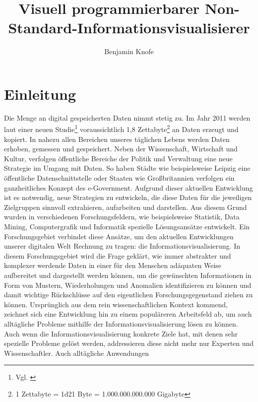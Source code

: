 \documentclass[a4paper, 12pt, DIVcalc, onepage, pdftex, headsepline, footsepline]{scrreprt}
\begin{document}
\title{Visuell programmierbarer Non-Standard-Informationsvisualisierer}
\author{Benjamin Knofe}
\subject{Diplomarbeit}
\publishers{Hochschule für Technik, Wirtschaft und Kultur Leipzig}
\dedication{Dank an \\ Pyry Jahkola, Philip Whitfield}
\maketitle
\tableofcontents

\chapter{Einleitung}
\label{cha:Einleitung}
Die Menge an digital gespeicherten Daten nimmt stetig zu. Im Jahr 2011 werden laut einer neuen
Studie\footnote{Vgl. \citep{EMC}} voraussichtlich 1,8 Zettabyte\footnote{1 Zettabyte = \num{1d21}
Byte = 1.000.000.000.000 Gigabyte} an Daten erzeugt und kopiert. In nahezu allen Bereichen unseres
täglichen Lebens werden Daten erhoben, gemessen und gespeichert. Neben der Wissenschaft, Wirtschaft
und Kultur, verfolgen öffentliche Bereiche der Politik und Verwaltung eine neue Strategie im Umgang
mit Daten. So haben Städte wie beispielsweise Leipzig eine öffentliche Datenschnittstelle oder
Staaten wie Großbritannien verfolgen ein ganzheitliches Konzept des e-Government. Aufgrund dieser
aktuellen Entwicklung ist es notwendig, neue Strategien zu entwickeln, die diese Daten
für die jeweiligen Zielgruppen sinnvoll extrahieren, aufarbeiten und darstellen. Aus diesem
Grund wurden in verschiedenen Forschungsfeldern, wie beispielsweise Statistik, Data Mining,
Computergrafik und Informatik spezielle Lösungsansätze entwickelt. Ein Forschungsgebiet verbindet diese
Ansätze, um den aktuellen Entwicklungen unserer digitalen Welt Rechnung zu tragen: die Informationsvisualisierung.
In diesem Forschungsgebiet wird die Frage geklärt, wie immer abstrakter und komplexer werdende Daten
in einer für den Menschen adäquaten Weise aufbereitet und dargestellt werden können, um die gewünschten
Informationen in Form von Mustern, Wiederholungen und Anomalien identifizieren zu können und damit wichtige
Rückschlüsse auf den eigentlichen Forschungsgegenstand ziehen zu können. Ursprünglich aus dem rein
wissenschaftlichen Kontext kommend, zeichnet sich eine Entwicklung hin zu einem populäreren Arbeitsfeld ab,
um auch alltägliche Probleme mithilfe der Informationsvisualisierung lösen zu können.
Auch wenn die Informationsvisualisierung konkrete Ziele hat, mit denen sehr spezielle Probleme gelöst
werden, addressieren diese nicht mehr nur Experten und Wissenschaftler. Auch alltägliche Anwendungen
\end{document}
